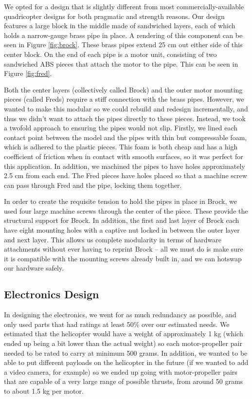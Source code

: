 \documentclass[letterpaper]{article}
\begin{document}
We opted for a design that is slightly different from most
commercially-available quadricopter designs for both pragmatic and
strength reasons. Our design features a large block in the middle made
of sandwiched layers, each of which holds a narrow-gauge brass pipe in
place. A rendering of this component can be seen in Figure
\ref{fig:brock}. These brass pipes extend 25 cm out either side of this
center block. On the end of each pipe is a motor unit, consisting of
two sandwiched ABS pieces that attach the motor to the pipe. This can
be seen in Figure \ref{fig:fred}.

Both the center layers (collectively called Brock) and the outer motor
mounting pieces (called Freds) require a stiff connection with the
brass pipes. However, we wanted to make this modular so we could
rebuild and redesign incrementally, and thus we didn't want to attach
the pipes directly to these pieces. Instead, we took a twofold
approach to ensuring the pipes would not slip. Firstly, we lined each
contact point between the model and the pipes with thin but
compressable foam, which is adhered to the plastic pieces. This foam
is both cheap and has a high coefficient of friction when in contact
with smooth surfaces, so it was perfect for this application. In
addition, we machined the pipes to have holes approximately 2.5 cm
from each end. The Fred pieces have holes placed so that a machine
screw can pass through Fred and the pipe, locking them together.

In order to create the requisite tension to hold the pipes in place in
Brock, we used four large machine screws through the center of the
piece. These provide the structural support for Brock. In addition,
the first and last layer of Brock each have eight mounting holes
with a captive nut locked in between the outer layer and next
layer. This allows us complete modularity in terms of hardware
attachments without ever having to reprint Brock -- all we must do is
make sure it is compatible with the mounting screws already built in,
and we can hotswap our hardware safely.

\subsection{Electronics Design}
In designing the electronics, we went for as much redundancy as
possible, and only used parts that had ratings at least 50\% over our
estimated needs. We estimated that the helicopter would have a weight
of approximately 1 kg (which ended up being a bit lower than the
actual weight) so each motor-propeller pair needed to be rated to
carry at minimum 500 grams. In addition, we wanted to be able to put
different payloads on the helicopter in the future (if we wanted to
add a video camera, for example) so we ended up going with
motor-propeller pairs that are capable of a very large range of
possible thrusts, from around 50 grams to about 1.5 kg per motor.
\end{document}
